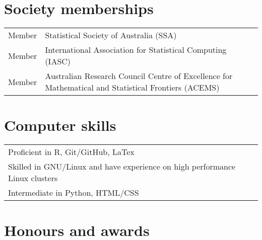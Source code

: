 \documentclass[10pt,a4paper,]{article}
\begin{document}
\section{Society memberships}\label{society-memberships}

\begin{tabular}{ll}
  Member & Statistical Society of Australia (SSA) \\ 
  Member & International Association for Statistical Computing (IASC) \\ 
  Member & Australian Research Council Centre of Excellence for Mathematical and Statistical Frontiers (ACEMS) \\ 
  \end{tabular}

\section{Computer skills}\label{computer-skills}

\begin{tabular}{l}
  Proficient in R, Git/GitHub, LaTex \\ 
  Skilled in GNU/Linux and have experience on high performance Linux clusters \\ 
  Intermediate in Python, HTML/CSS \\ 
  \end{tabular}

\section{Honours and awards}\label{honours-and-awards}
\end{document}
